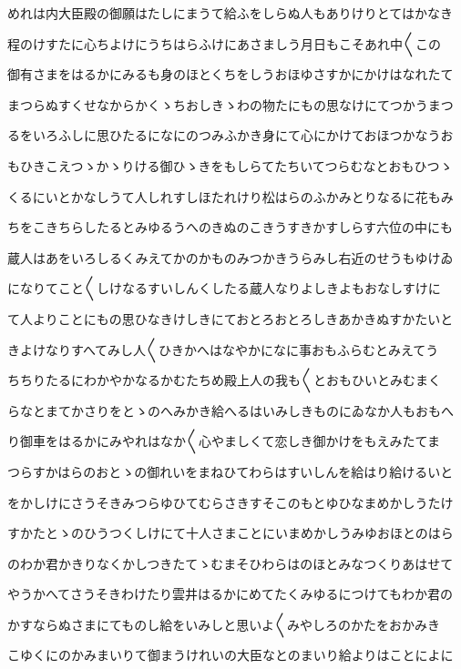 \documentclass[a4paper,11pt,landscape]{ltjtarticle}
\begin{document}
めれは内大臣殿の御願はたしにまうて給ふをしらぬ人もありけりとてはかなき
\par\medskip
程のけすたに心ちよけにうちはらふけにあさましう月日もこそあれ中〱この
\par\medskip
御有さまをはるかにみるも身のほとくちをしうおほゆさすかにかけはなれたて
\par\medskip
まつらぬすくせなからかくゝちおしきゝわの物たにもの思なけにてつかうまつ
\par\medskip
るをいろふしに思ひたるになにのつみふかき身にて心にかけておほつかなうお
\par\medskip
もひきこえつゝかゝりける御ひゝきをもしらてたちいてつらむなとおもひつゝ
\par\medskip
くるにいとかなしうて人しれすしほたれけり松はらのふかみとりなるに花もみ
\par\medskip
ちをこきちらしたるとみゆるうへのきぬのこきうすきかすしらす六位の中にも
\par\medskip
蔵人はあをいろしるくみえてかのかものみつかきうらみし右近のせうもゆけゐ
\par\medskip
になりてこと〱しけなるすいしんくしたる蔵人なりよしきよもおなしすけに
\par\medskip
て人よりことにもの思ひなきけしきにておとろおとろしきあかきぬすかたいと
\par\medskip
きよけなりすへてみし人〱ひきかへはなやかになに事おもふらむとみえてう
\par\medskip
ちちりたるにわかやかなるかむたちめ殿上人の我も〱とおもひいとみむまく
\par\medskip
らなとまてかさりをとゝのへみかき給へるはいみしきものにゐなか人もおもへ
\par\medskip
り御車をはるかにみやれはなか〱心やましくて恋しき御かけをもえみたてま
\par\medskip
つらすかはらのおとゝの御れいをまねひてわらはすいしんを給はり給けるいと
\par\medskip
をかしけにさうそきみつらゆひてむらさきすそこのもとゆひなまめかしうたけ
\par\medskip
すかたとゝのひうつくしけにて十人さまことにいまめかしうみゆおほとのはら
\par\medskip
のわか君かきりなくかしつきたてゝむまそひわらはのほとみなつくりあはせて
\par\medskip
やうかへてさうそきわけたり雲井はるかにめてたくみゆるにつけてもわか君の
\par\medskip
かすならぬさまにてものし給をいみしと思いよ〱みやしろのかたをおかみき
\par\medskip
こゆくにのかみまいりて御まうけれいの大臣なとのまいり給よりはことによに
\end{document}
